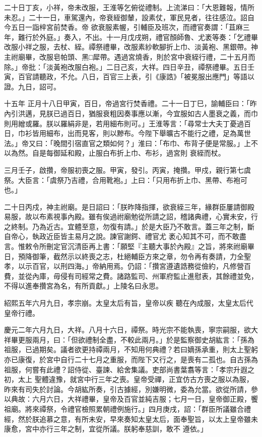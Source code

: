 \begin{pinyinscope}
 二十日丁亥，小祥，帝未改服，王淮等乞俯從禮制。上流涕曰：「大恩難報，情所未忍。」二十一日，車駕還內，帝衰絰御輦，設素仗，軍民見者，往往感泣。詔自今五日一詣梓宮前焚香。帝
 欲衰服素幄，引輔臣及班次，而禮官奏謂：「苴麻三年，難行於外庭。」奏入，不出。十一月戊戌朔，禮官顏師魯、尤袤等奏：「乞禮畢改服小祥之服，去杖、絰。禫祭禮畢，改服素紗軟腳折上巾、淡黃袍、黑銀帶。神主祔廟畢，改服皂帕頭、黑□犀帶。遇過宮燒香，則於宮中衰絰行禮，二十五月而除。」帝批：「淡黃袍改服白袍。」二日己亥，大祥。四日辛丑，禫祭禮畢。五日壬寅，百官請聽政，不允。八日，百官三上表，引《康誥》「被冕服出應門」等語以證。九日，詔可。



 十五年
 正月十八日甲寅，百日，帝過宮行焚香禮。二十一日丁巳，諭輔臣曰：「昨內引洪邁，見朕已過百日，猶服衰粗因奏事應以漸，今宜服如古人墨衰之義，而巾則用繒或羅。朕以羅絹非是，若用細布則可。」王淮等言：「尋常士大夫丁憂過百日，巾衫皆用細布，出而見客，則以黲布。今陛下舉曠古不能行之禮，足為萬世法。」帝又曰：「晚間引宿直官之類如何？」淮曰：「布巾、布背子便是常服。」上不以為然。自是每御延和殿，止服白布折上巾、布衫，過宮則
 衰絰而杖。



 三月壬子，啟攢，帝服初喪之服。甲寅，發引。丙寅，掩攢。甲戍，親行第七虞祭。大臣言：「虞祭乃吉禮，合用靴袍。」上曰：「只用布折上巾、黑帶、布袍可也。」



 二十日丙戍，神主祔廟。是日詔曰：「朕昨降指揮，欲衰絰三年，緣群臣屢請御殿易服，故以布素視事內殿。雖有俟過祔廟勉從所請之詔，稽諸典禮，心實未安，行之終制。乃為近古。宜體至意，勿復有請。」於是大臣乃不敢言。蓋三年之制，斷自帝心，執政近臣皆主易月之說。諫官謝鍔、禮官尤
 袤心知其不可，而不敢盡言。惟敕令所刪定官沉清臣再上書：「願堅『主聽大事於內殿』之旨，將來祔廟畢日，預降御筆，截然示以終喪之志，杜絕輔臣方來之章，勿令再有奏請，力全聖孝，以示百官，以刑四海。」帝納用焉。仍詔：「攢宮遵遺誥務從儉約，凡修營百費，並從內庫，毋侵有司經常之費。諸路監司、州軍府監止進慰表，其餘禮並免，不得以進奉攢宮為名，有所貢獻。」上陵名曰永思。



 紹熙五年六月九日，孝宗崩。太皇太后有旨，皇帝以疾
 聽在內成服，太皇太后代皇帝行禮。



 慶元二年六月九日，大祥。八月十六日，禫祭。時光宗不能執喪，寧宗嗣服，欲大祥畢更服兩月，曰：「但欲禮制全盡，不較此兩月。」於是監察御史胡紘言：「孫為祖服，已過期矣。議者欲更持禫兩月，不知用何典禮？若曰嫡孫承重，則太上聖躬亦已康復，於宮中自行二十七月之重服，而陛下又行之，是喪有二孤也。自古孫為祖服，何嘗有此禮？詔侍從、臺諫、給舍集議。吏部尚書葉翥等言：「孝宗升遐之初，太上
 聖體違豫，就宮中行三年之喪。皇帝受禪，正宜仿古方喪之服以為服，昨來有司失於討論。今胡紘所奏，引古據經，別嫌明微，委為允當。欲從所請，參以典故：六月六日，大祥禮畢，皇帝及百官並純吉服；七月一日，皇帝御正殿，饗祖廟。將來禫祭，令禮官檢照累朝禮例施行。」四月庚戌，詔：「群臣所議雖合禮經，然於朕追慕之意，有所未安，早來奏知太皇太后，面奉聖旨，以太上皇帝雖未康愈，宮中亦行三年之制，宜從所議。朕躬奉慈訓，敢不
 遵依。」




\end{pinyinscope}
